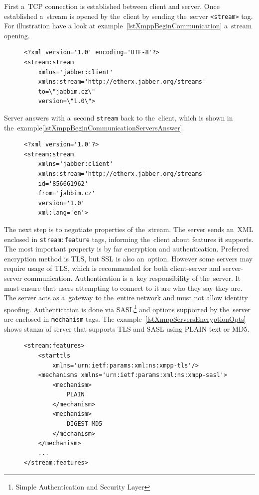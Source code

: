 First a~TCP connection is established between client and server. Once established a~stream is opened by the~client by sending the~server \verb|<stream>| tag. For illustration have a look at example~\ref{lstXmppBeginCommunication}  a~stream opening. 

\begin{figure}[h]
\begin{lstlisting}
<?xml version='1.0' encoding='UTF-8'?>
<stream:stream 
	xmlns='jabber:client' 
	xmlns:stream='http://etherx.jabber.org/streams' 
	to=\"jabbim.cz\" 
	version=\"1.0\">
\end{lstlisting}
\end{figure}

Server answers with a~second \verb|stream| back to the~client, which is shown in the~example\ref{lstXmppBeginCommunicationServersAnswer}. 

\begin{figure}[h]
\begin{lstlisting}
<?xml version='1.0'?>
<stream:stream 
	xmlns='jabber:client' 
	xmlns:stream='http://etherx.jabber.org/streams' 
	id='856661962' 
	from='jabbim.cz' 
	version='1.0' 
	xml:lang='en'>
\end{lstlisting}
\end{figure}

The next step is to negotiate properties of the~stream. The server sends an~XML enclosed in \verb|stream:feature| tags, informing the~client about features it supports. The most important property is by far encryption and authentication. Preferred encryption method is TLS, but SSL is also an~option. However some servers may require usage of TLS, which is recommended for both client-server and server-server communication. Authentication is a~key responsibility of the~server. It must ensure that users attempting to connect to it are who they say they are. The server acts as a~gateway to the~entire network and must not allow identity spoofing. Authentication is done via SASL\footnote{Simple Authentication and Security Layer} and options supported by the~server are enclosed in \verb|mechanism| tags. The example~\ref{lstXmppServersEncryptionOpts} shows stanza of server that supports TLS and SASL using PLAIN text or MD5.   

\begin{figure}[h]
\begin{lstlisting}
<stream:features>
	<starttls 
		xmlns='urn:ietf:params:xml:ns:xmpp-tls'/>
	<mechanisms xmlns='urn:ietf:params:xml:ns:xmpp-sasl'>
		<mechanism>
			PLAIN
		</mechanism>
		<mechanism>
			DIGEST-MD5
		</mechanism>
	</mechanism>
	...
</stream:features>
\end{lstlisting}
\end{figure}

